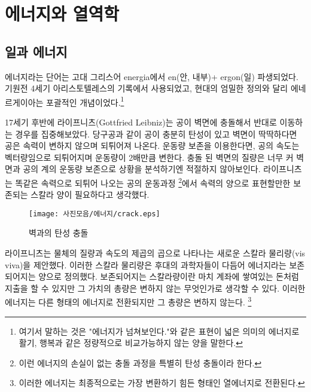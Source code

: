 \chapter{에너지와 열역학}

\begin{flushleft}
\section{일과 에너지}
    
에너지라는 단어는 고대 그리스어 energia에서 en(안, 내부)+ ergon(일) 파생되었다.
 기원전 4세기 아리스토텔레스의 기록에서 사용되었고, 
 현대의 엄밀한 정의와 달리 에네르게이아는 포괄적인 개념이었다.\footnote{여기서 말하는 것은 "에너지가 넘쳐보인다."와 같은 표현이 넓은 의미의 
 에너지로 활기, 행복과 같은 정량적으로 비교가능하지 않는 양을 말한다.}

17세기 후반에 라이프니츠(Gottfried Leibniz)는 공이 벽면에 충돌해서 반대로 이동하는 경우를 집중해보았다. 
당구공과 같이 공이 충분히 탄성이 있고 벽면이 딱딱하다면 공은 속력이 변하지 않으며 되튀어져 나온다. 
운동량 보존을 이용한다면,
공의 속도는 벡터량임으로 되튀어지며 운동량이 2배만큼 변한다. 충돌 된 
벽면의 질량은 너무 커 벽면과 공의 계의 운동량 보존으로 상황을 분석하기엔 적절하지 않아보인다.
라이프니츠는 똑같은 속력으로 되튀어 나오는 공의 운동과정
\footnote{이런 에너지의 손실이 없는 충돌 과정을 특별히 탄성 충돌이라 한다.}에서 
속력의 양으로 표현할만한 보존되는 스칼라 양이 필요하다고 생각했다. 

      
\begin{figure}[h]
\centering
   \texttt{[image: 사진모음/에너지/crack.eps]}
   \caption{벽과의 탄성 충돌}
\end{figure}

라이프니츠는 물체의 질량과 속도의 제곱의 곱으로 나타나는 새로운 스칼라 물리량(vis viva)을 제안했다.  
이러한 스칼라 물리량은 후대의 과학자들이 다듬어 에너지라는 보존되어지는 양으로 정의했다. 
보존되어지는 스칼라량이란 마치 계좌에 쌓여있는 돈처럼 지출을 할 수 있지만 
그 가치의 총량은 변하지 않는 무엇인가로 생각할 수 있다. 이러한 에너지는 다른 형태의 에너지로 전환되지만 그 총량은 변하지 않는다.
\footnote{이러한 에너지는 최종적으로는 가장 변환하기 힘든 형태인 열에너지로 전환된다.} 




\end{flushleft}
